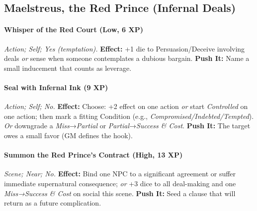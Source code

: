\documentclass[12pt,twoside]{book}
\begin{document}
\subsection{Maelstreus, the Red Prince (Infernal Deals)}
\paragraph{Whisper of the Red Court (Low, 6 XP)} \emph{Action; Self; Yes (temptation).}
\textbf{Effect:} +1 die to Persuasion/Deceive involving deals \emph{or} sense when someone contemplates a dubious bargain.
\textbf{Push It:} Name a small inducement that counts as leverage.
\paragraph{Seal with Infernal Ink (9 XP)} \emph{Action; Self; No.}
\textbf{Effect:} Choose: +2 effect on one action \emph{or} start \emph{Controlled} on one action; then mark a fitting Condition (e.g., \emph{Compromised/Indebted/Tempted}). \emph{Or} downgrade a \emph{Miss}→\emph{Partial} or \emph{Partial}→\emph{Success \& Cost}.
\textbf{Push It:} The target owes a small favor (GM defines the hook).
\paragraph{Summon the Red Prince’s Contract (High, 13 XP)} \emph{Scene; Near; No.}
\textbf{Effect:} Bind one NPC to a significant agreement or suffer immediate supernatural consequence; \emph{or} +3 dice to all deal-making and one \emph{Miss→Success \& Cost} on social this scene.
\textbf{Push It:} Seed a clause that will return as a future complication.
\end{document}
